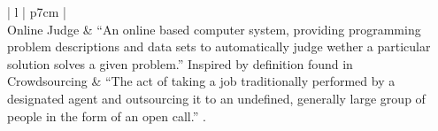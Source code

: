 \begin{table}[t!]
    \centering
    \begin{tabular}{ | l | p{7cm} | }
    \hline
     \\
    \hline
    Online Judge & ``An online based computer system, providing programming problem descriptions and data sets to automatically judge wether a particular solution solves a given problem.'' Inspired by definition found in \cite{a:Kurnia2001}  \\ \hline
    Crowdsourcing & ``The act of taking a job traditionally performed by a designated agent and outsourcing it to an undefined, generally large group of people in the form of an open call.'' \cite{CROWDSOURCING}. \\ \hline
    \end{tabular}
    \caption{Defining \glspl{oj} and Crowdsourcing}
    \label{tab:definitions}
\end{table}
